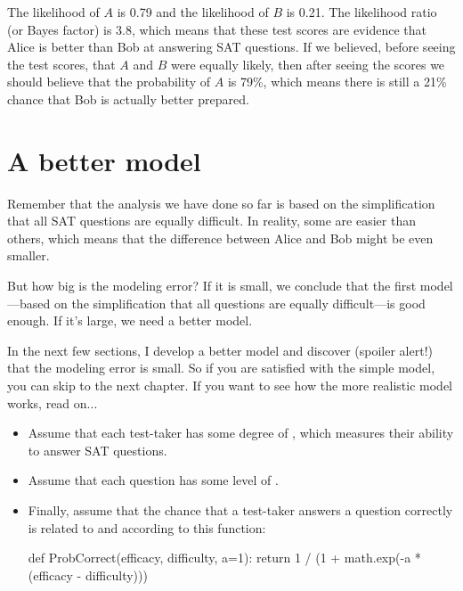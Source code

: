\documentclass[12pt]{book}
\theoremstyle{exercise}
\begin{document}
The likelihood of $A$ is 0.79 and the likelihood of $B$ is 0.21.  The
likelihood ratio (or Bayes factor) is 3.8, which means that these test
scores are evidence that Alice is better than Bob at answering SAT
questions.  If we believed, before seeing the test scores, that $A$
and $B$ were equally likely, then after seeing the scores we should
believe that the probability of $A$ is 79\%, which means there is
still a 21\% chance that Bob is actually better prepared.


\section{A better model}

Remember that the analysis we have done so far is based on
the simplification that all SAT questions are equally difficult.
In reality, some are easier than others, which means that the
difference between Alice and Bob might be even smaller.

But how big is the modeling error?  If it is small, we conclude
that the first model---based on the simplification that all questions
are equally difficult---is good enough.  If it's large,
we need a better model.

In the next few sections, I develop a better model and 
discover (spoiler alert!) that the modeling error is small.  So if
you are satisfied with the simple model, you can skip to the next
chapter.  If you want to see how the more realistic model works,
read on...

\begin{itemize}

\item Assume that each test-taker has some 
  degree of , which measures their
  ability to answer SAT questions.

\item Assume that each question has some level of
  .

\item Finally, assume that the chance that a test-taker answers a
  question correctly is related to  and 
  according to this function:

\begin{code}
def ProbCorrect(efficacy, difficulty, a=1):
    return 1 / (1 + math.exp(-a * (efficacy - difficulty)))
\end{code}

\end{itemize}
\end{document}
